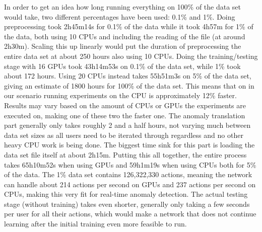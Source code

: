 In order to get an idea how long running everything on 100\% of the data set would take, two different percentages have been used: 0.1\% and 1\%. Doing preprocessing took 2h45m14s for 0.1\% of the data while it took 4h57m for 1\% of the data, both using 10 CPUs and including the reading of the file (at around 2h30m). Scaling this up linearly would put the duration of preprocessing the entire data set at about 250 hours also using 10 CPUs. Doing the training/testing stage with 16 GPUs took 43h14m53s on 0.1\% of the data set, while 1\% took about 172 hours. Using 20 CPUs instead takes
 55h51m3s on 5\% of the data set, giving an estimate of 1800 hours for 100\%
 of the data set. This means that on in our scenario running experiments on the CPU is approximately 12\% faster. Results may vary based on the amount of CPUs or GPUs the experiments are executed on, making one of these two the faster one. The anomaly translation part generally only takes roughly 2 and a half hours, not varying much between data set sizes as all users need to be iterated through regardless and no other heavy CPU work is being done. The biggest time sink for this part is loading the data set file itself at about 2h15m. Putting this all together, the entire process takes 
 65h10m52s when using GPUs and 59h1m19s when using CPUs both for 5\% of the data. The 1\% data set contains 126,322,330 actions, meaning the network can handle about 214 actions per second on GPUs and 237 actions per second on CPUs, making this very fit for real-time anomaly detection. The actual testing stage (without training) takes even shorter, generally only taking a few seconds per user for all their actions, which would make a network that does not continue learning after the initial training even more feasible to run.
